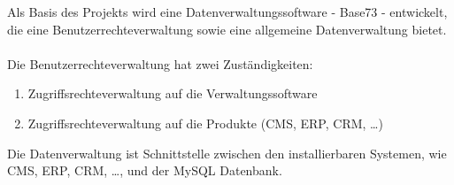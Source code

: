 Als Basis des Projekts wird eine Datenverwaltungssoftware - Base73 - entwickelt, die
eine Benutzerrechteverwaltung sowie eine allgemeine Datenverwaltung bietet.
\\ \\ Die Benutzerrechteverwaltung hat zwei Zuständigkeiten:
\begin{enumerate}
	\item Zugriffsrechteverwaltung auf die Verwaltungssoftware
	\item Zugriffsrechteverwaltung auf die Produkte (\gls{CMS}, \gls{ERP}, CRM, \ldots)
\end{enumerate}
Die Datenverwaltung ist Schnittstelle zwischen den installierbaren Systemen, wie CMS, ERP, CRM, \ldots, und der MySQL Datenbank.